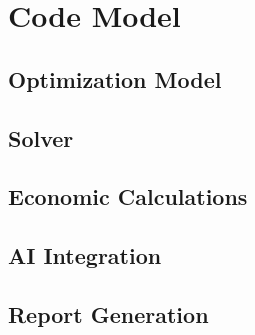 
\section{Code Model}
\subsection{Optimization Model}
\subsection{Solver}
\subsection{Economic Calculations} 
\subsection{AI Integration}
\subsection{Report Generation}